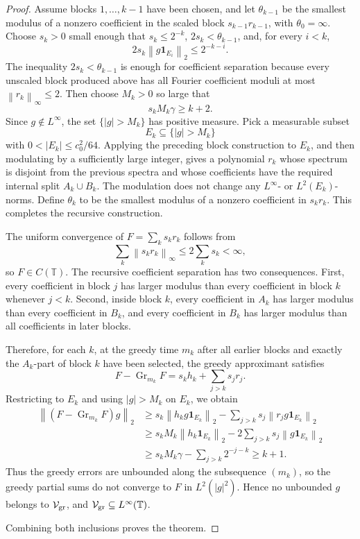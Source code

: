 \documentclass[11pt]{article}
\newcommand{\T}{\mathbb T}
\newcommand{\norm}[1]{\left\lVert #1 \right\rVert}
\newcommand{\abs}[1]{\left\lvert #1 \right\rvert}
\newcommand{\one}{\mathbf 1}
\newcommand{\Gr}{\operatorname{Gr}}
\begin{document}
\begin{proof}
Assume blocks \(1,\ldots,k-1\) have been chosen, and let \(\theta_{k-1}\) be the smallest modulus of a nonzero coefficient in the scaled block \(s_{k-1}r_{k-1}\), with \(\theta_0=\infty\). Choose \(s_k>0\) small enough that \(s_k\le 2^{-k}\), \(2s_k<\theta_{k-1}\), and, for every \(i<k\),
\[
  2s_k\norm{g\one_{E_i}}_2\le 2^{-k-i}.
\]
The inequality \(2s_k<\theta_{k-1}\) is enough for coefficient separation because every unscaled block produced above has all Fourier coefficient moduli at most \(\norm{r_k}_\infty\le 2\).
Then choose \(M_k>0\) so large that
\[
  s_k M_k\gamma\ge k+2.
\]
Since \(g\notin L^\infty\), the set \(\{\abs g>M_k\}\) has positive measure. Pick a measurable subset
\[
  E_k\subseteq \{\abs g>M_k\}
\]
with \(0<\abs{E_k}\le c_0^2/64\). Applying the preceding block construction to \(E_k\), and then modulating by a sufficiently large integer, gives a polynomial \(r_k\) whose spectrum is disjoint from the previous spectra and whose coefficients have the required internal split \(A_k\cup B_k\). The modulation does not change any \(L^\infty\)- or \(L^2(E_k)\)-norms. Define \(\theta_k\) to be the smallest modulus of a nonzero coefficient in \(s_kr_k\). This completes the recursive construction.

The uniform convergence of \(F=\sum_k s_k r_k\) follows from
\[
  \sum_k \norm{s_k r_k}_\infty
  \le 2\sum_k s_k
  <\infty,
\]
so \(F\in C(\T)\). The recursive coefficient separation has two consequences. First, every coefficient in block \(j\) has larger modulus than every coefficient in block \(k\) whenever \(j<k\). Second, inside block \(k\), every coefficient in \(A_k\) has larger modulus than every coefficient in \(B_k\), and every coefficient in \(B_k\) has larger modulus than all coefficients in later blocks.

Therefore, for each \(k\), at the greedy time \(m_k\) after all earlier blocks and exactly the \(A_k\)-part of block \(k\) have been selected, the greedy approximant satisfies
\[
  F-\Gr_{m_k}F
  =
  s_k h_k+\sum_{j>k}s_j r_j.
\]
Restricting to \(E_k\) and using \(\abs g>M_k\) on \(E_k\), we obtain
\[
\begin{aligned}
  \norm{(F-\Gr_{m_k}F)g}_2
  &\ge
  s_k\norm{h_k g\one_{E_k}}_2
  -
  \sum_{j>k}s_j\norm{r_j g\one_{E_k}}_2 \\
  &\ge
  s_k M_k\norm{h_k\one_{E_k}}_2
  -
  2\sum_{j>k}s_j\norm{g\one_{E_k}}_2 \\
  &\ge
  s_k M_k\gamma
  -
  \sum_{j>k}2^{-j-k}
  \ge k+1.
\end{aligned}
\]
Thus the greedy errors are unbounded along the subsequence \((m_k)\), so the greedy partial sums do not converge to \(F\) in \(L^2(|g|^2)\). Hence no unbounded \(g\) belongs to \(\mathcal V_{\rm gr}\), and \(\mathcal V_{\rm gr}\subseteq L^\infty(\T)\).

Combining both inclusions proves the theorem.
\end{proof}
\end{document}
